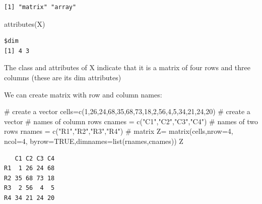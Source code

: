 \documentclass[
  letterpaper,
  DIV=11,
  numbers=noendperiod]{scrreprt}
\newenvironment{Shaded}{\begin{snugshade}}{\end{snugshade}}
\newcommand{\AttributeTok}[1]{\textcolor[rgb]{0.40,0.45,0.13}{#1}}
\newcommand{\CommentTok}[1]{\textcolor[rgb]{0.37,0.37,0.37}{#1}}
\newcommand{\ConstantTok}[1]{\textcolor[rgb]{0.56,0.35,0.01}{#1}}
\newcommand{\DecValTok}[1]{\textcolor[rgb]{0.68,0.00,0.00}{#1}}
\newcommand{\FunctionTok}[1]{\textcolor[rgb]{0.28,0.35,0.67}{#1}}
\newcommand{\NormalTok}[1]{\textcolor[rgb]{0.00,0.23,0.31}{#1}}
\newcommand{\OtherTok}[1]{\textcolor[rgb]{0.00,0.23,0.31}{#1}}
\newcommand{\StringTok}[1]{\textcolor[rgb]{0.13,0.47,0.30}{#1}}
\begin{document}
\begin{verbatim}
[1] "matrix" "array" 
\end{verbatim}

\begin{Shaded}
\begin{Highlighting}[]
\FunctionTok{attributes}\NormalTok{(X)}
\end{Highlighting}
\end{Shaded}

\begin{verbatim}
$dim
[1] 4 3
\end{verbatim}

The class and attributes of X indicate that it is a matrix of four rows
and three columns (these are its dim attributes)

We can create matrix with row and column names:

\begin{Shaded}
\begin{Highlighting}[]
\CommentTok{\# create a vector }
\NormalTok{cells}\OtherTok{=}\FunctionTok{c}\NormalTok{(}\DecValTok{1}\NormalTok{,}\DecValTok{26}\NormalTok{,}\DecValTok{24}\NormalTok{,}\DecValTok{68}\NormalTok{,}\DecValTok{35}\NormalTok{,}\DecValTok{68}\NormalTok{,}\DecValTok{73}\NormalTok{,}\DecValTok{18}\NormalTok{,}\DecValTok{2}\NormalTok{,}\DecValTok{56}\NormalTok{,}\DecValTok{4}\NormalTok{,}\DecValTok{5}\NormalTok{,}\DecValTok{34}\NormalTok{,}\DecValTok{21}\NormalTok{,}\DecValTok{24}\NormalTok{,}\DecValTok{20}\NormalTok{)  }\CommentTok{\# create a vector}
\CommentTok{\# names of column rows}
\NormalTok{cnames }\OtherTok{=} \FunctionTok{c}\NormalTok{(}\StringTok{"C1"}\NormalTok{,}\StringTok{"C2"}\NormalTok{,}\StringTok{"C3"}\NormalTok{,}\StringTok{"C4"}\NormalTok{) }
\CommentTok{\# names of two rows}
\NormalTok{rnames }\OtherTok{=} \FunctionTok{c}\NormalTok{(}\StringTok{"R1"}\NormalTok{,}\StringTok{"R2"}\NormalTok{,}\StringTok{"R3"}\NormalTok{,}\StringTok{"R4"}\NormalTok{) }
\CommentTok{\# matrix}
\NormalTok{Z}\OtherTok{=} \FunctionTok{matrix}\NormalTok{(cells,}\AttributeTok{nrow=}\DecValTok{4}\NormalTok{, }\AttributeTok{ncol=}\DecValTok{4}\NormalTok{, }\AttributeTok{byrow=}\ConstantTok{TRUE}\NormalTok{,}\AttributeTok{dimnames=}\FunctionTok{list}\NormalTok{(rnames,cnames))}
\NormalTok{Z}
\end{Highlighting}
\end{Shaded}

\begin{verbatim}
   C1 C2 C3 C4
R1  1 26 24 68
R2 35 68 73 18
R3  2 56  4  5
R4 34 21 24 20
\end{verbatim}
\end{document}
